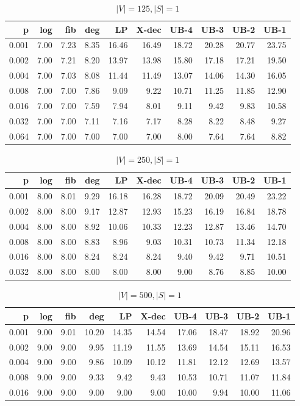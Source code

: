 \begin{table}[]
\centering
\begin{tabular}{rrrrrrrrrr}
p     & log  & fib  & deg  & LP    & X-dec & UB-4  & UB-3  & UB-2  & UB-1  \\
\hline
0.001 & 7.00 & 7.23 & 8.35 & 16.46 & 16.49 & 18.72 & 20.28 & 20.77 & 23.75 \\
0.002 & 7.00 & 7.21 & 8.20 & 13.97 & 13.98 & 15.80 & 17.18 & 17.21 & 19.50 \\
0.004 & 7.00 & 7.03 & 8.08 & 11.44 & 11.49 & 13.07 & 14.06 & 14.30 & 16.05 \\
0.008 & 7.00 & 7.00 & 7.86 & 9.09  & 9.22  & 10.71 & 11.25 & 11.85 & 12.90 \\
0.016 & 7.00 & 7.00 & 7.59 & 7.94  & 8.01  & 9.11  & 9.42  & 9.83  & 10.58 \\
0.032 & 7.00 & 7.00 & 7.11 & 7.16  & 7.17  & 8.28  & 8.22  & 8.48  & 9.27  \\
0.064 & 7.00 & 7.00 & 7.00 & 7.00  & 7.00  & 8.00  & 7.64  & 7.64  & 8.82 
\end{tabular}
\caption{$|V|=125, |S|=1$}
\label{tab:lbup125}
\end{table}

\begin{table}[]
\centering
\begin{tabular}{rrrrrrrrrr}
p     & log  & fib  & deg  & LP    & X-dec & UB-4  & UB-3  & UB-2  & UB-1  \\
\hline
0.001 & 8.00 & 8.01 & 9.29 & 16.18 & 16.28 & 18.72 & 20.09 & 20.49 & 23.22 \\
0.002 & 8.00 & 8.00 & 9.17 & 12.87 & 12.93 & 15.23 & 16.19 & 16.84 & 18.78 \\
0.004 & 8.00 & 8.00 & 8.92 & 10.06 & 10.33 & 12.23 & 12.87 & 13.46 & 14.70 \\
0.008 & 8.00 & 8.00 & 8.83 & 8.96  & 9.03  & 10.31 & 10.73 & 11.34 & 12.18 \\
0.016 & 8.00 & 8.00 & 8.24 & 8.24  & 8.24  & 9.40  & 9.42  & 9.71  & 10.51 \\
0.032 & 8.00 & 8.00 & 8.00 & 8.00  & 8.00  & 9.00  & 8.76  & 8.85  & 10.00
\end{tabular}
\caption{$|V|=250, |S|=1$}
\label{tab:lbup250}
\end{table}


\begin{table}[]
\centering
\begin{tabular}{rrrrrrrrrr}
p     & log  & fib  & deg  & LP    & X-dec & UB-4  & UB-3  & UB-2  & UB-1  \\
\hline
0.001 & 9.00 & 9.01 & 10.20 & 14.35 & 14.54 & 17.06 & 18.47 & 18.92 & 20.96 \\
0.002 & 9.00 & 9.00 & 9.95  & 11.19 & 11.55 & 13.69 & 14.54 & 15.11 & 16.53 \\
0.004 & 9.00 & 9.00 & 9.86  & 10.09 & 10.12 & 11.81 & 12.12 & 12.69 & 13.57 \\
0.008 & 9.00 & 9.00 & 9.33  & 9.42  & 9.43  & 10.53 & 10.71 & 11.07 & 11.84 \\
0.016 & 9.00 & 9.00 & 9.00  & 9.00  & 9.00  & 10.00 & 9.94  & 10.00 & 11.06
\end{tabular}
\caption{$|V|=500, |S|=1$}
\label{tab:lbup500}
\end{table}

